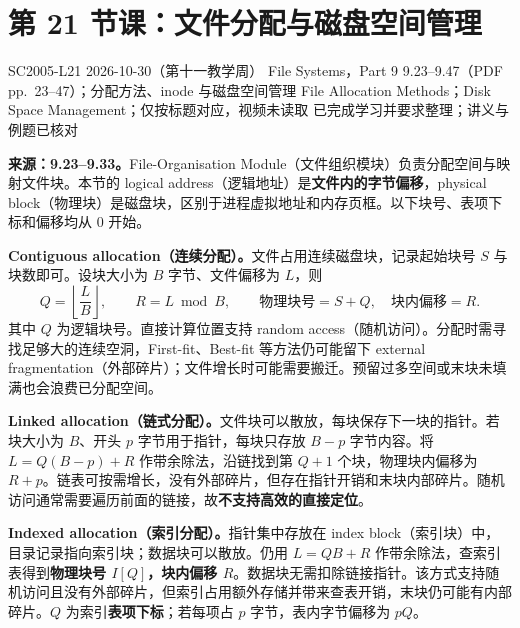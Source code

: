 \begingroup
\renewcommand{\recordid}[1]{}
\renewcommand{\relatedexercise}[2]{\hyperref[exercise:#1]{#2}}
\section{第 21 节课：文件分配与磁盘空间管理}
\label{lecture:SC2005-L21}

\lecturemeta
  {SC2005-L21}
  {2026-10-30（第十一教学周）}
  {File Systems，Part 9}
  {9.23--9.47（PDF pp.~23--47）；分配方法、inode 与磁盘空间管理}
  {File Allocation Methods；Disk Space Management；仅按标题对应，视频未读取}
  {已完成学习并要求整理；讲义与例题已核对}

\linespread{1.15}\selectfont
\setlength{\parskip}{0.4em}



\textbf{来源：9.23--9.33。}File-Organisation Module（文件组织模块）负责分配空间与映射文件块。本节的 logical address（逻辑地址）是\textbf{文件内的字节偏移}，physical block（物理块）是磁盘块，区别于进程虚拟地址和内存页框。以下块号、表项下标和偏移均从 $0$ 开始。

\textbf{Contiguous allocation（连续分配）。}文件占用连续磁盘块，记录起始块号 $S$ 与块数即可。设块大小为 $B$ 字节、文件偏移为 $L$，则
\[
  Q=\left\lfloor\frac{L}{B}\right\rfloor,\qquad R=L\bmod B,
  \qquad \boxed{\text{物理块号}=S+Q,\quad\text{块内偏移}=R}.
\]
其中 $Q$ 为逻辑块号。直接计算位置支持 random access（随机访问）。分配时需寻找足够大的连续空洞，First-fit、Best-fit 等方法仍可能留下 external fragmentation（外部碎片）；文件增长时可能需要搬迁。预留过多空间或末块未填满也会浪费已分配空间。

\textbf{Linked allocation（链式分配）。}文件块可以散放，每块保存下一块的指针。若块大小为 $B$、开头 $p$ 字节用于指针，每块只存放 $B-p$ 字节内容。将 $L=Q(B-p)+R$ 作带余除法，沿链找到第 $Q+1$ 个块，物理块内偏移为 $R+p$。链表可按需增长，没有外部碎片，但存在指针开销和末块内部碎片。随机访问通常需要遍历前面的链接，故\textbf{不支持高效的直接定位}。

\textbf{Indexed allocation（索引分配）。}指针集中存放在 index block（索引块）中，目录记录指向索引块；数据块可以散放。仍用 $L=QB+R$ 作带余除法，查索引表得到\textbf{物理块号 $I[Q]$，块内偏移 $R$}。数据块无需扣除链接指针。该方式支持随机访问且没有外部碎片，但索引占用额外存储并带来查表开销，末块仍可能有内部碎片。$Q$ 为索引\textbf{表项下标}；若每项占 $p$ 字节，表内字节偏移为 $pQ$。

